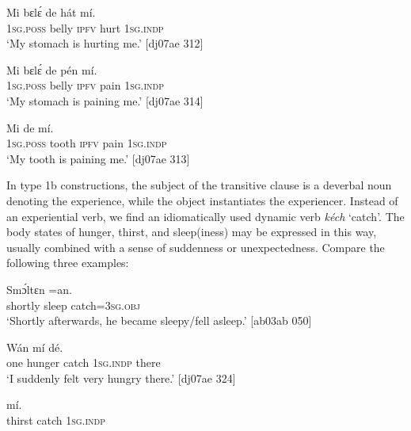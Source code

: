 \ea%
    \label{ex:key:1249}
    \gll Mi    bɛlɛ́    de  hát    mí.\\
\textsc{1sg.poss}  belly  \textsc{ipfv}  hurt    \textsc{1sg.indp}\\

\glt ‘My stomach is hurting me.’ [dj07ae 312]
\z


\ea%
    \label{ex:key:1250}
    \gll Mi    bɛlɛ́    de  pén    mí.\\
\textsc{1sg.poss}  belly  \textsc{ipfv}  pain    \textsc{1sg.indp}\\

\glt ‘My stomach is paining me.’ [dj07ae 314]
\z


\ea%
    \label{ex:key:1251}
    \gll Mi        de      mí.\\
\textsc{1sg.poss}  tooth  \textsc{ipfv}  pain    \textsc{1sg.indp}\\

\glt ‘My tooth is paining me.’ [dj07ae 313]
\z

In type 1b constructions, the subject of the transitive clause is a deverbal noun denoting the experience, while the object instantiates the experiencer. Instead of an experiential verb, we find an idiomatically used dynamic verb \textit{kéch} ‘catch’. The body states of hunger, thirst, and sleep(iness) may be expressed in this way, usually combined with a sense of suddenness or unexpectedness. Compare the following three examples:


\ea%
    \label{ex:key:1252}
    \gll Smɔ́ltɛn        =an.\\
shortly    sleep  catch=\textsc{3sg.obj}\\

\glt ‘Shortly afterwards, he became sleepy/fell asleep.’ [ab03ab 050]
\z


\ea%
    \label{ex:key:1253}
    \gll Wán        mí    dé.\\
one    hunger  catch  \textsc{1sg.indp}  there\\

\glt ‘I suddenly felt very hungry there.’ [dj07ae 324]
\z


\ea%
    \label{ex:key:1254}
    \gll {}    mí.\\
thirst  catch  \textsc{1sg.indp}\\

